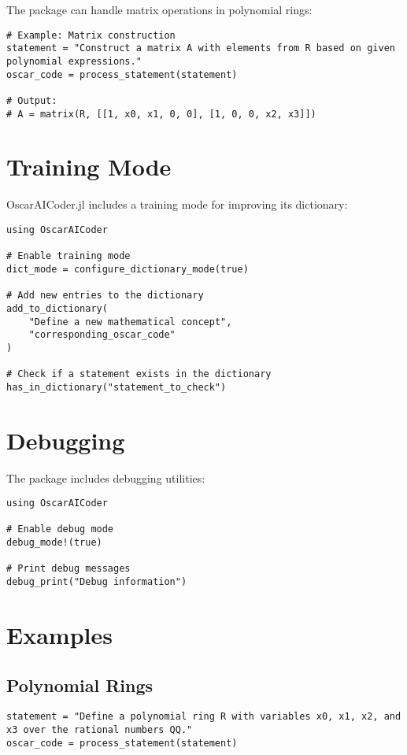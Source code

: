 \documentclass[11pt,a4paper]{article}
\begin{document}
The package can handle matrix operations in polynomial rings:

\begin{lstlisting}
# Example: Matrix construction
statement = "Construct a matrix A with elements from R based on given polynomial expressions."
oscar_code = process_statement(statement)

# Output:
# A = matrix(R, [[1, x0, x1, 0, 0], [1, 0, 0, x2, x3]])
\end{lstlisting}

\section{Training Mode}

OscarAICoder.jl includes a training mode for improving its dictionary:

\begin{lstlisting}
using OscarAICoder

# Enable training mode
dict_mode = configure_dictionary_mode(true)

# Add new entries to the dictionary
add_to_dictionary(
    "Define a new mathematical concept",
    "corresponding_oscar_code"
)

# Check if a statement exists in the dictionary
has_in_dictionary("statement_to_check")
\end{lstlisting}

\section{Debugging}

The package includes debugging utilities:

\begin{lstlisting}
using OscarAICoder

# Enable debug mode
debug_mode!(true)

# Print debug messages
debug_print("Debug information")
\end{lstlisting}

\section{Examples}

\subsection{Polynomial Rings}

\begin{lstlisting}
statement = "Define a polynomial ring R with variables x0, x1, x2, and x3 over the rational numbers QQ."
oscar_code = process_statement(statement)
\end{lstlisting}
\end{document}
